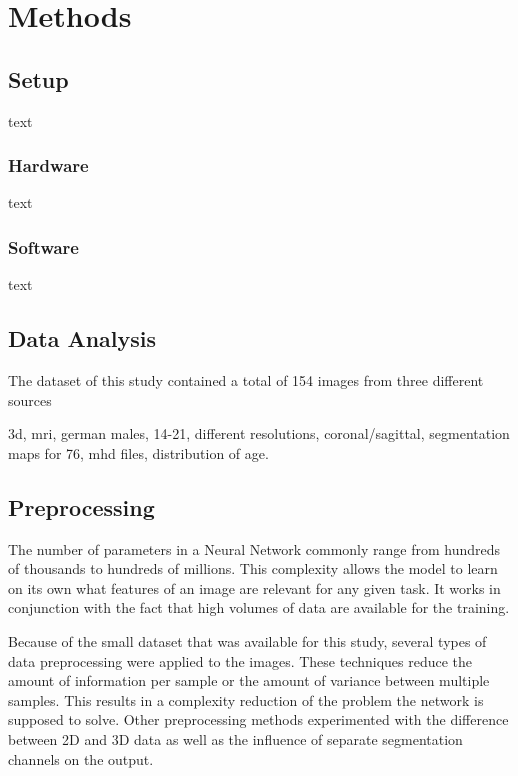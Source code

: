 \section{Methods}

\subsection{Setup}

text

\subsubsection{Hardware}

text

\subsubsection{Software}

text

\subsection{Data Analysis}

The dataset of this study contained a total of 154 images from three different sources

3d, mri, german males, 14-21, different resolutions, coronal/sagittal, segmentation maps for 76, mhd files, distribution of age.



\subsection{Preprocessing}

The number of parameters in a Neural Network commonly range from hundreds of thousands to hundreds of millions. This complexity allows the model to learn on its own what features of an image are relevant for any given task. It works in conjunction with the fact that high volumes of data are available for the training.

Because of the small dataset that was available for this study, several types of data preprocessing were applied to the images. These techniques reduce the amount of information per sample or the amount of variance between multiple samples. This results in a complexity reduction of the problem the network is supposed to solve. Other preprocessing methods experimented with the difference between 2D and 3D data as well as the influence of separate segmentation channels on the output.

